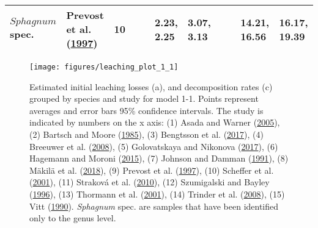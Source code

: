 \documentclass[
  12pt,
]{article}
\begin{document}
\begin{table}[H]
{\begin{tabular}[t]{llrllllllll}
\multirow[t]{-2}{*}{\raggedright\arraybackslash $Sphagnum$ spec.} & Prevost et al. (\protect\hyperlink{ref-Prevost.1997}{1997}) & 10 &  &  & 2.23, 2.25 & 3.07, 3.13 &  &  & 14.21, 16.56 & 16.17, 19.39\\
\bottomrule
\end{tabular}}
\end{table}

\clearpage

















\begin{figure}[H]

{\centering \texttt{[image: figures/leaching\_plot\_1\_1]} 

}

\caption{Estimated initial leaching losses (a), and decomposition rates (c) grouped by species and study for model 1-1. Points represent averages and error bars 95\% confidence intervals. The study is indicated by numbers on the x axis: (1) Asada and Warner (\protect\hyperlink{ref-Asada.2005b}{2005}), (2) Bartsch and Moore (\protect\hyperlink{ref-Bartsch.1985}{1985}), (3) Bengtsson et al. (\protect\hyperlink{ref-Bengtsson.2017}{2017}), (4) Breeuwer et al. (\protect\hyperlink{ref-Breeuwer.2008}{2008}), (5) Golovatskaya and Nikonova (\protect\hyperlink{ref-Golovatskaya.2017}{2017}), (6) Hagemann and Moroni (\protect\hyperlink{ref-Hagemann.2015}{2015}), (7) Johnson and Damman (\protect\hyperlink{ref-Johnson.1991}{1991}), (8) Mäkilä et al. (\protect\hyperlink{ref-Makila.2018}{2018}), (9) Prevost et al. (\protect\hyperlink{ref-Prevost.1997}{1997}), (10) Scheffer et al. (\protect\hyperlink{ref-Scheffer.2001}{2001}), (11) Straková et al. (\protect\hyperlink{ref-Strakova.2010}{2010}), (12) Szumigalski and Bayley (\protect\hyperlink{ref-Szumigalski.1996}{1996}), (13) Thormann et al. (\protect\hyperlink{ref-Thormann.2001}{2001}), (14) Trinder et al. (\protect\hyperlink{ref-Trinder.2008}{2008}), (15) Vitt (\protect\hyperlink{ref-Vitt.1990}{1990}). \emph{Sphagnum} spec. are samples that have been identified only to the genus level.}\label{fig:sup-out-mm-p5-1-1}
\end{figure}
\end{document}
